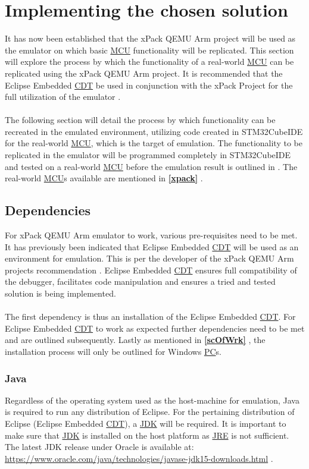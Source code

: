 \section{Implementing the chosen solution}
\label{CompSolu}
It has now been established that the xPack QEMU Arm project will be used as the emulator on which basic \hyperref[listAbr]{MCU} functionality will be replicated. This section will explore the process by which the functionality of a real-world \hyperref[listAbr]{MCU} can be replicated using the xPack QEMU Arm project. It is recommended that the Eclipse Embedded \hyperref[listAbr]{CDT} be used in conjunction with the xPack Project for the full utilization of the emulator \cite{emailIl}.
\\\\
The following section will detail the process by which functionality can be recreated in the emulated environment, utilizing code created in STM32CubeIDE for the real-world \hyperref[listAbr]{MCU}, which is the target of emulation. The functionality to be replicated in the emulator will be programmed completely in STM32CubeIDE and tested on a real-world \hyperref[listAbr]{MCU} before the emulation result is outlined in \textbf{}. The real-world \hyperref[listAbr]{MCU}s available are mentioned in \textbf{\ref{xpack} }.

\subsection{Dependencies}
\label{dependencies}
For xPack QEMU Arm emulator to work, various pre-requisites need to be met. It has previously been  indicated that Eclipse Embedded \hyperref[listAbr]{CDT} will be used as an environment for emulation. This is per the developer of the xPack QEMU Arm projects recommendation \cite{emailIl}. Eclipse Embedded \hyperref[listAbr]{CDT} ensures full compatibility of the debugger, facilitates code manipulation and ensures a tried and tested solution is being implemented.
\\\\
The first dependency is thus an installation of the Eclipse Embedded \hyperref[listAbr]{CDT}. For Eclipse Embedded \hyperref[listAbr]{CDT} to work as expected further dependencies need to be met and are outlined subsequently. Lastly as mentioned in \textbf{\ref{scOfWrk} }, the installation process will only be outlined for Windows \hyperref[listAbr]{PC}s.

\subsubsection{Java}
\label{Java}
Regardless of the operating system used as the host-machine for emulation, Java is required to run any distribution of Eclipse. For the pertaining distribution of Eclipse (Eclipse Embedded \hyperref[listAbr]{CDT}), a \hyperref[listAbr]{JDK} will be required. It is important to make sure that \hyperref[listAbr]{JDK} is installed on the host platform as \hyperref[listAbr]{JRE} is not sufficient. The latest JDK release under Oracle is available at: \color{blue}\url{https://www.oracle.com/java/technologies/javase-jdk15-downloads.html} \color{black} \cite{emailIl} \cite{eclipse}.


